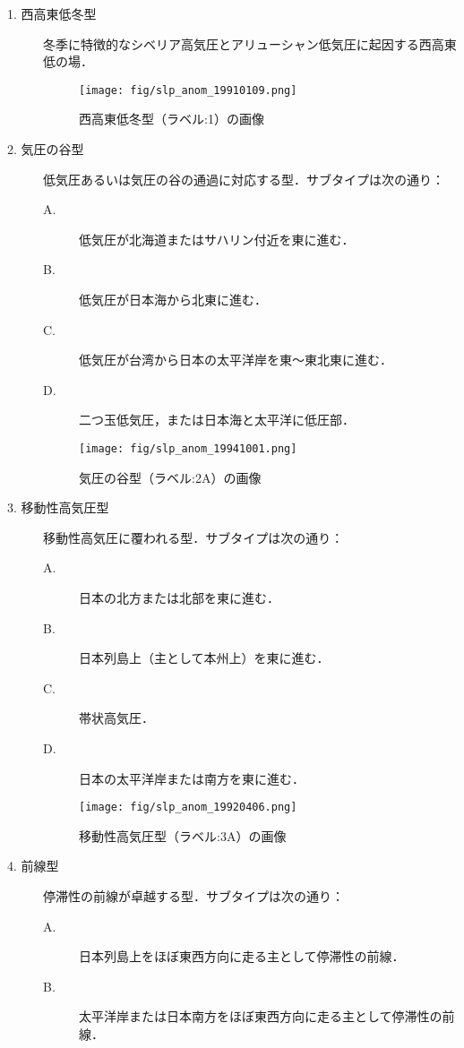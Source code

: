 \documentclass{jarticle}
\theoremstyle{definition}
\begin{document}
\begin{description}
\item[1. 西高東低冬型] 冬季に特徴的なシベリア高気圧とアリューシャン低気圧に起因する西高東低の場．

\begin{figure}[H] \centering \texttt{[image: fig/slp\_anom\_19910109.png]} \caption{西高東低冬型（ラベル:1）の画像} \label{fig:slp_anom_19910109} \end{figure}

\item[2. 気圧の谷型] 低気圧あるいは気圧の谷の通過に対応する型．サブタイプは次の通り：
  \begin{description}
    \item[A.] 低気圧が北海道またはサハリン付近を東に進む．
    \item[B.] 低気圧が日本海から北東に進む．
    \item[C.] 低気圧が台湾から日本の太平洋岸を東〜東北東に進む．
    \item[D.] 二つ玉低気圧，または日本海と太平洋に低圧部．
  \end{description}

\begin{figure}[H] \centering \texttt{[image: fig/slp\_anom\_19941001.png]} \caption{気圧の谷型（ラベル:2A）の画像} \label{fig:slp_anom_19941001} \end{figure}

\item[3. 移動性高気圧型] 移動性高気圧に覆われる型．サブタイプは次の通り：
  \begin{description}
    \item[A.] 日本の北方または北部を東に進む．
    \item[B.] 日本列島上（主として本州上）を東に進む．
    \item[C.] 帯状高気圧．
    \item[D.] 日本の太平洋岸または南方を東に進む．
  \end{description}

\begin{figure}[H] \centering \texttt{[image: fig/slp\_anom\_19920406.png]} \caption{移動性高気圧型（ラベル:3A）の画像} \label{fig:slp_anom_19920406} \end{figure}

\item[4. 前線型] 停滞性の前線が卓越する型．サブタイプは次の通り：
  \begin{description}
    \item[A.] 日本列島上をほぼ東西方向に走る主として停滞性の前線．
    \item[B.] 太平洋岸または日本南方をほぼ東西方向に走る主として停滞性の前線．
  \end{description}


\end{description}
\end{document}
